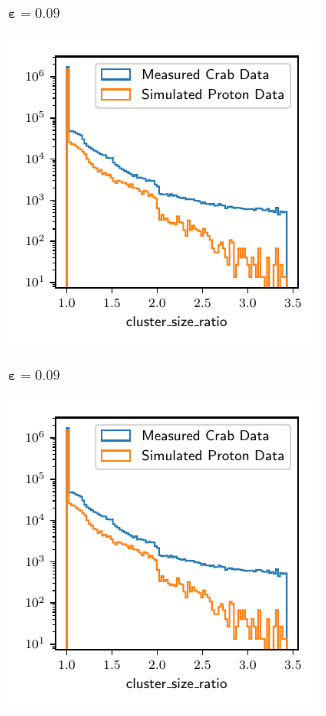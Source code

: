\begin{figure}
\begin{subfigure}{0.5\textwidth}
  \end{subfigure}
  \begin{subfigure}{0.5\textwidth}
    \centering
    $\symbf{\varepsilon = 0.09}$\par\smallskip
    \includegraphics[width=0.9\textwidth, page=23]{Plots/Epsilon/09_comparison.pdf}
  \end{subfigure}
  \begin{subfigure}{0.5\textwidth}
    \centering
    $\symbf{\varepsilon = 0.09}$\par\smallskip
    \includegraphics[width=0.9\textwidth, page=2]{Plots/Epsilon/09_comparison.pdf}

\end{subfigure}
\end{figure}
